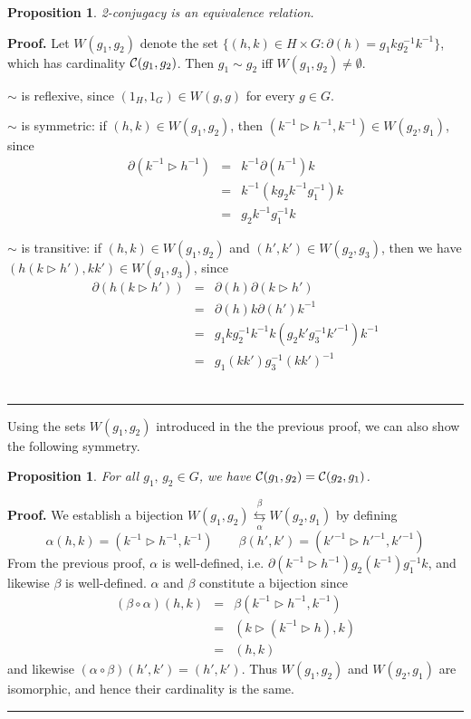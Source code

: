 \documentclass[a4paper,11pt]{article}
\newtheorem{Proposition}[Theorem]{Proposition}
\newenvironment{Proof}[1][Proof]{\textbf{#1.} }{\ \rule{0.5em}{0.5em}}
\def \tr {\triangleright}
\begin{document}
\begin{Proposition} 
2-conjugacy is an equivalence relation.
\end{Proposition}

\begin{Proof}
Let $W(g_1,g_2)$ denote the set $\{ (h,k) \in H \times G : \partial(h) = g_1 k g_2^{-1} k^{-1} \}$, which has cardinality ${\cal C}(g_1,g_2)$. Then $g_1 \sim g_2 $ iff $W(g_1,g_2)\neq \emptyset$.

$\sim$ is reflexive, since $(1_H,1_G)\in W(g,g)$ for every $g\in G$.

$\sim$ is symmetric: if $(h,k) \in W(g_1,g_2)$, then $(k^{-1}\tr h^{-1},k^{-1}) \in W(g_2,g_1)$, since 
\begin{eqnarray*}
\partial(k^{-1}\tr h^{-1}) & = & k^{-1} \partial(h^{-1})k \\
&=&  k^{-1} (kg_2k^{-1}g_1^{-1})k \\
&=& g_2 k^{-1} g_1^{-1} k
\end{eqnarray*}

$\sim$ is transitive: if $(h,k) \in W(g_1,g_2)$  and $(h',k') \in W(g_2,g_3)$, then we have
$(h(k\tr h'),kk') \in W(g_1,g_3)$, since
\begin{eqnarray*}
\partial(h(k\tr h')) & = & \partial(h) \partial(k\tr h') \\
&=& \partial(h) k \partial( h') k^{-1} \\
& = & g_1 k g_2^{-1} k^{-1} k  (g_2 k' g_3^{-1} k'^{-1}) k^{-1} \\
&=& g_1 (kk') g_3^{-1} (kk')^{-1}
\end{eqnarray*}
\end{Proof}
\vskip 0.2cm

Using the sets $W(g_1,g_2)$ introduced in the the previous proof, we can also show the following symmetry.
\begin{Proposition} 
For all $g_1,\, g_2\in G$, we have ${\cal C}(g_1,g_2)={\cal C}(g_2,g_1)$.
\end{Proposition}
\begin{Proof}
We establish a bijection $W(g_1,g_2) \underset{\alpha}{\overset{\beta}{\leftrightarrows}}  W(g_2,g_1)$ by defining
$$
\alpha(h,k)=(k^{-1}\tr h^{-1}, k^{-1}) \qquad \beta(h',k') = (k'^{-1}\tr h'^{-1},k'^{-1})
$$
From the previous proof, $\alpha$ is well-defined, i.e. 
$\partial(k^{-1}\tr h^{-1})  g_2(k^{-1})g_1^{-1} k$,
and likewise $\beta$ is well-defined. 
%
$\alpha$ and $\beta$ constitute a bijection since 
\begin{eqnarray*}
(\beta\circ\alpha)(h,k) & = & \beta(k^{-1}\tr h^{-1}, k^{-1}) \\
& = & (k\tr (k^{-1}\tr h),k) \\
& = & (h,k)
\end{eqnarray*}
and likewise $(\alpha\circ\beta)(h',k')=(h',k')$. Thus $W(g_1,g_2)$ and  $W(g_2,g_1)$ are isomorphic, and hence their cardinality is the same. 
\end{Proof}
\end{document}
